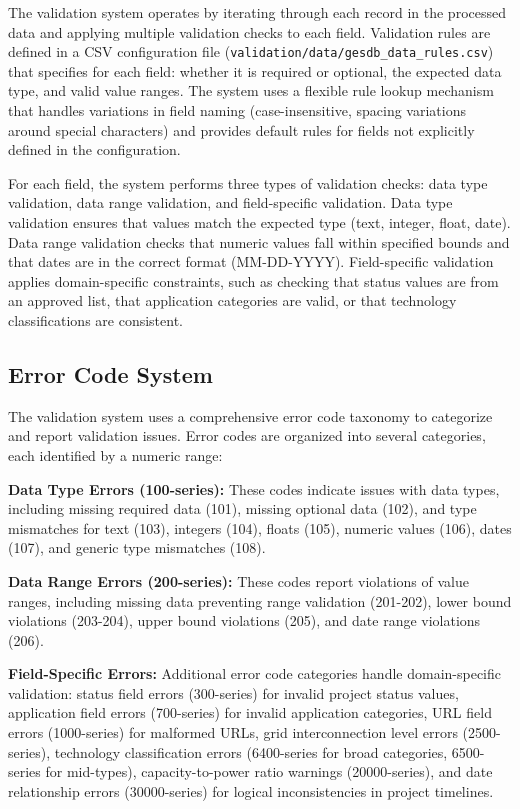 \documentclass[11pt]{article}
\begin{document}
The validation system operates by iterating through each record in the processed data and applying multiple validation checks to each field. Validation rules are defined in a CSV configuration file (\texttt{validation/data/gesdb\_data\_rules.csv}) that specifies for each field: whether it is required or optional, the expected data type, and valid value ranges. The system uses a flexible rule lookup mechanism that handles variations in field naming (case-insensitive, spacing variations around special characters) and provides default rules for fields not explicitly defined in the configuration.

For each field, the system performs three types of validation checks: data type validation, data range validation, and field-specific validation. Data type validation ensures that values match the expected type (text, integer, float, date). Data range validation checks that numeric values fall within specified bounds and that dates are in the correct format (MM-DD-YYYY). Field-specific validation applies domain-specific constraints, such as checking that status values are from an approved list, that application categories are valid, or that technology classifications are consistent.

\subsection{Error Code System}

The validation system uses a comprehensive error code taxonomy to categorize and report validation issues. Error codes are organized into several categories, each identified by a numeric range:

\textbf{Data Type Errors (100-series):} These codes indicate issues with data types, including missing required data (101), missing optional data (102), and type mismatches for text (103), integers (104), floats (105), numeric values (106), dates (107), and generic type mismatches (108).

\textbf{Data Range Errors (200-series):} These codes report violations of value ranges, including missing data preventing range validation (201-202), lower bound violations (203-204), upper bound violations (205), and date range violations (206).

\textbf{Field-Specific Errors:} Additional error code categories handle domain-specific validation: status field errors (300-series) for invalid project status values, application field errors (700-series) for invalid application categories, URL field errors (1000-series) for malformed URLs, grid interconnection level errors (2500-series), technology classification errors (6400-series for broad categories, 6500-series for mid-types), capacity-to-power ratio warnings (20000-series), and date relationship errors (30000-series) for logical inconsistencies in project timelines.
\end{document}
